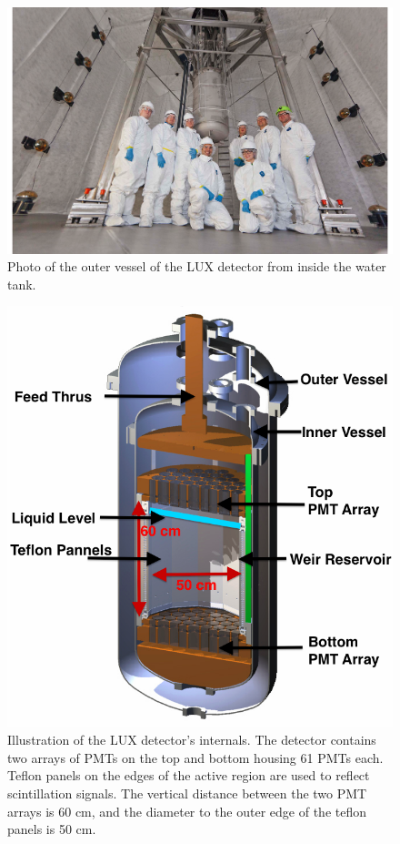  \begin{figure}[h!]\centering
\includegraphics[scale=0.5]{Chapter_LUX_Det/LUX_Real.png}
\caption{Photo of the outer vessel of the LUX detector from inside the water tank.}
\label{fig:LUX_Real}
\end{figure}


 \begin{figure}[h!]\centering
\includegraphics[scale=0.5]{Chapter_LUX_Det/LUX_half_rendering_white_text.png}
\caption{Illustration of the LUX detector's internals. The detector contains two arrays of PMTs on the top and bottom housing 61 PMTs each. Teflon panels on the edges of the active region are used to reflect scintillation signals. The vertical distance between the two PMT arrays is 60 cm, and the diameter to the outer edge of the teflon panels is 50 cm. }
\label{fig:LUX_TPC}
\end{figure}

